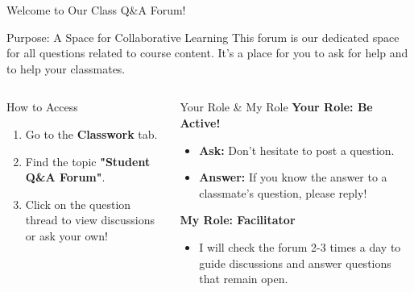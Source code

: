 \documentclass[11pt,aspectratio=169]{beamer}
\begin{document}
\begin{frame}{Welcome to Our Class Q\&A Forum!}
    \begin{block}{Purpose: A Space for Collaborative Learning}
        This forum is our dedicated space for all questions related to course content. It's a place for you to ask for help and to help your classmates. 
    \end{block}

    \begin{columns}[T] %
        \begin{column}{0.48\textwidth}
            \begin{block}{How to Access}
                \begin{enumerate}
                    \item Go to the \textbf{Classwork} tab.
                    \item Find the topic \textbf{"Student Q\&A Forum"}.
                    \item Click on the question thread to view discussions or ask your own!
                \end{enumerate}
            \end{block}
        \end{column}
        \begin{column}{0.48\textwidth}
            \begin{block}{Your Role \& My Role}
                \textbf{Your Role: Be Active!}
                \begin{itemize}
                    \item \textbf{Ask:} Don't hesitate to post a question.
                    \item \textbf{Answer:} If you know the answer to a classmate's question, please reply! 
                \end{itemize}
                \textbf{My Role: Facilitator}
                \begin{itemize}
                    \item I will check the forum 2-3 times a day to guide discussions and answer questions that remain open. 
                \end{itemize}
            \end{block}
        \end{column}
    \end{columns}
\end{frame}
\end{document}
